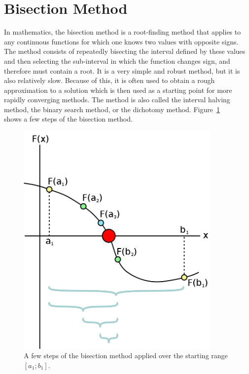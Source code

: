 \documentclass[a4paper, 12pt]{report}
\begin{document}
    \section{Bisection Method}
    In mathematics, the bisection method is a root-finding method that applies to any continuous functions for which one knows two values with opposite signs. The method consists of repeatedly bisecting the interval defined by these values and then selecting the sub-interval in which the function changes sign, and therefore must contain a root. It is a very simple and robust method, but it is also relatively slow. Because of this, it is often used to obtain a rough approximation to a solution which is then used as a starting point for more rapidly converging methods. The method is also called the interval halving method, the binary search method, or the dichotomy method.
    Figure~\ref{fig:BM}\\ shows a few steps of the bisection method.
    \begin{figure}[h]
    \centering
    \includegraphics[width=10cm]{Bisection Method.png}
    \caption{A few steps of the bisection method applied over the starting range $[a_{1};b_{1}]$.}
    \label{fig:BM}
    \end{figure}
\end{document}
